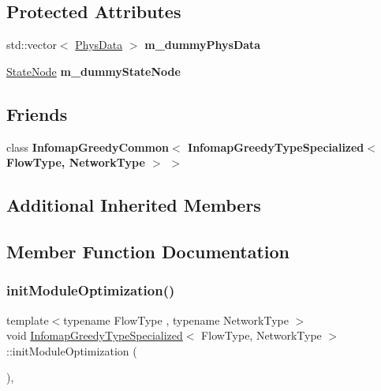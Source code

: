 \subsection*{Protected Attributes}
\begin{DoxyCompactItemize}
\item 
\mbox{\label{classInfomapGreedyTypeSpecialized_a2c8d55320c48d369c00b9e24f66243cb}} 
std\+::vector$<$ \mbox{\hyperlink{structPhysData}{Phys\+Data}} $>$ {\bfseries m\+\_\+dummy\+Phys\+Data}
\item 
\mbox{\label{classInfomapGreedyTypeSpecialized_a9c3da7afef28b6eadf8efb925fcd02ac}} 
\mbox{\hyperlink{structStateNode}{State\+Node}} {\bfseries m\+\_\+dummy\+State\+Node}
\end{DoxyCompactItemize}
\subsection*{Friends}
\begin{DoxyCompactItemize}
\item 
\mbox{\label{classInfomapGreedyTypeSpecialized_a3ad40e214c14218d6b3f0b96d50d5f05}} 
class {\bfseries Infomap\+Greedy\+Common$<$ Infomap\+Greedy\+Type\+Specialized$<$ Flow\+Type, Network\+Type $>$ $>$}
\end{DoxyCompactItemize}
\subsection*{Additional Inherited Members}


\subsection{Member Function Documentation}
\mbox{\label{classInfomapGreedyTypeSpecialized_a2f5fa9b865bcded24d7875f56d28d4c5}} 
\subsubsection{\texorpdfstring{init\+Module\+Optimization()}{initModuleOptimization()}}
{\footnotesize\ttfamily template$<$typename Flow\+Type , typename Network\+Type $>$ \\
void \mbox{\hyperlink{classInfomapGreedyTypeSpecialized}{Infomap\+Greedy\+Type\+Specialized}}$<$ Flow\+Type, Network\+Type $>$\+::init\+Module\+Optimization (\begin{DoxyParamCaption}{ }\end{DoxyParamCaption})\hspace{0.3cm}{\ttfamily [protected]}, {\ttfamily [virtual]}}

